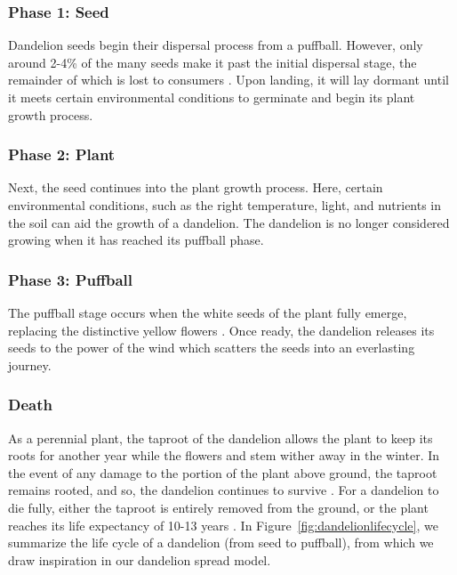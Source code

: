 \subsubsection{Phase 1: Seed}
Dandelion seeds begin their dispersal process from a puffball. However, only around 2-4\% of the many seeds make it past the initial dispersal stage, the remainder of which is lost to consumers \cite{noauthor_dandelion_nodate-2}. Upon landing, it will lay dormant until it meets certain environmental conditions to germinate and begin its plant growth process. 


\subsubsection{Phase 2: Plant}
Next, the seed continues into the plant growth process. Here, certain environmental conditions, such as the right temperature, light, and nutrients in the soil can aid the growth of a dandelion. The dandelion is no longer considered growing when it has reached its puffball phase.

\subsubsection{Phase 3: Puffball}
The puffball stage occurs when the white seeds of the plant fully emerge, replacing the distinctive yellow flowers  \cite{board_of_pesticides_control_maine_dacf_dandelion-taraxacum_nodate}. Once ready, the dandelion releases its seeds to the power of the wind which scatters the seeds into an everlasting journey.

\subsubsection{Death}
As a perennial plant, the taproot of the dandelion allows the plant to keep its roots for another year while the flowers and stem wither away in the winter. In the event of any damage to the portion of the plant above ground, the taproot remains rooted, and so, the dandelion continues to survive \cite{farmshowGrowingDandelions}. For a dandelion to die fully, either the taproot is entirely removed from the ground, or the plant reaches its life expectancy of 10-13 years \cite{noauthor_garden_nodate}. In Figure~\ref{fig:dandelionlifecycle}, we summarize the life cycle of a dandelion (from seed to puffball), from which we draw inspiration in our dandelion spread model.

